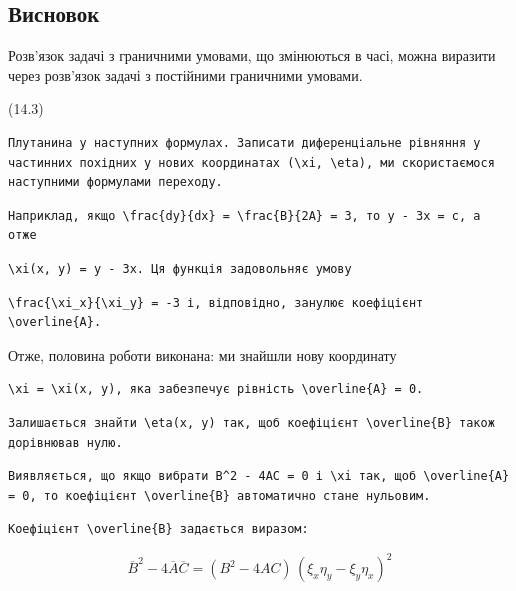 \documentclass[
  ukrainian,
]{article}
\begin{document}
\subsection{Висновок}\label{ux432ux438ux441ux43dux43eux432ux43eux43a}

Розв'язок задачі з граничними умовами, що змінюються в часі, можна
виразити через розв'язок задачі з постійними граничними умовами.

(14.3)

\begin{verbatim}
Плутанина у наступних формулах. Записати диференціальне рівняння у частинних похідних у нових координатах (\xi, \eta), ми скористаємося наступними формулами переходу.
\end{verbatim}

\begin{verbatim}
Наприклад, якщо \frac{dy}{dx} = \frac{B}{2A} = 3, то y - 3x = c, а отже
\end{verbatim}

\begin{verbatim}
\xi(x, y) = y - 3x. Ця функція задовольняє умову
\end{verbatim}

\begin{verbatim}
\frac{\xi_x}{\xi_y} = -3 і, відповідно, занулює коефіцієнт \overline{A}.
\end{verbatim}

Отже, половина роботи виконана: ми знайшли нову координату

\begin{verbatim}
\xi = \xi(x, y), яка забезпечує рівність \overline{A} = 0.
\end{verbatim}

\begin{verbatim}
Залишається знайти \eta(x, y) так, щоб коефіцієнт \overline{B} також дорівнював нулю.
\end{verbatim}

\begin{verbatim}
Виявляється, що якщо вибрати B^2 - 4AC = 0 і \xi так, щоб \overline{A} = 0, то коефіцієнт \overline{B} автоматично стане нульовим.
\end{verbatim}

\begin{verbatim}
Коефіцієнт \overline{B} задається виразом:
\end{verbatim}

\[
\overline{B}^2 - 4\overline{A}\overline{C} = (B^2 - 4AC)\,(\xi_x \eta_y - \xi_y \eta_x)^2
\]
\end{document}
